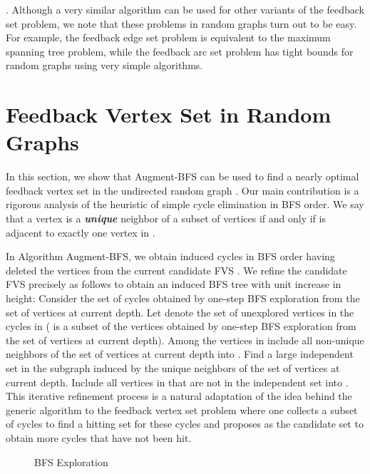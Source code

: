 \documentclass[11pt]{article}
\begin{document}
. Although a very similar algorithm can be used for other variants of the feedback set problem, we note that these problems in random graphs turn out to be easy. For example, the feedback edge set problem is equivalent to the maximum spanning tree problem, while the feedback arc set problem has tight bounds for random graphs using very simple algorithms.


\section{Feedback Vertex Set in Random Graphs}
In this section, we show that Augment-BFS can be used to find a nearly optimal feedback vertex set in the undirected random graph . Our main contribution is a rigorous analysis of the heuristic of simple cycle elimination in BFS order. We say that a vertex  is a {\bf \emph{unique}} neighbor of a subset of vertices  if and only if  is adjacent to exactly one vertex in .

In Algorithm Augment-BFS, we obtain induced cycles in BFS order having deleted the vertices from the current candidate FVS . We refine the candidate
FVS  precisely as follows to obtain an induced BFS tree with unit increase in height: Consider the set  of cycles obtained by one-step BFS exploration from the set of vertices at current depth. Let  denote the set of unexplored vertices in the cycles in  ( is a subset of the vertices obtained by one-step BFS exploration from the set of vertices at current depth). Among the vertices in  include all non-unique neighbors of the set of vertices at current depth into . Find a large independent set in the subgraph induced by the unique neighbors  of the set of vertices at current depth. Include all vertices in  that are not in the independent set into . This iterative refinement process is a natural adaptation of the idea behind the generic algorithm to the feedback vertex set problem where one collects a subset of cycles to find a hitting set  for these cycles and proposes  as the candidate set to obtain more cycles that have not been hit.

\begin{figure}[H]
\label{fig:bfs-exploration}
\begin{center}
\end{center}
\caption{BFS Exploration}
\end{figure}
\end{document}
